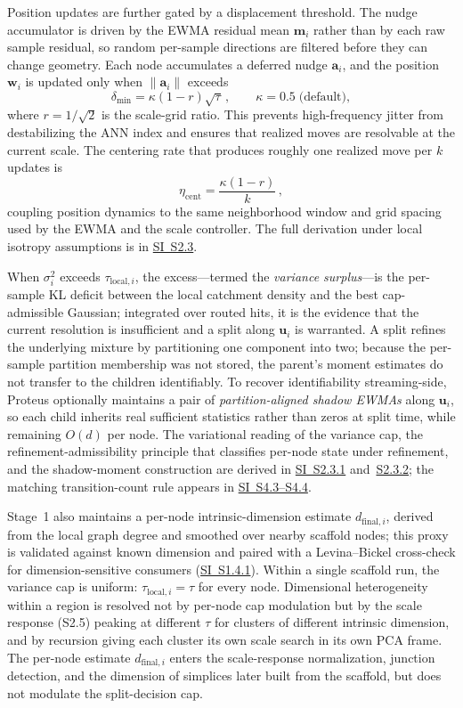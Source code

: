 \documentclass[11pt]{article}
\theoremstyle{definition}
\theoremstyle{plain}
\begin{document}
Position updates are further gated by a displacement threshold. The nudge accumulator is driven by the EWMA residual mean $\mathbf m_i$ rather than by each raw sample residual, so random per-sample directions are filtered before they can change geometry. Each node accumulates a deferred nudge $\mathbf a_i$, and the position $\mathbf w_i$ is updated only when $\|\mathbf a_i\|$ exceeds
\[
\delta_{\min}=\kappa(1-r)\sqrt{\tau}\,,
\qquad \kappa=0.5\;\text{(default)},
\]
where $r=1/\sqrt{2}$ is the scale-grid ratio. This prevents high-frequency jitter from destabilizing the ANN index and ensures that realized moves are resolvable at the current scale. The centering rate that produces roughly one realized move per $k$ updates is
\[
\eta_{\mathrm{cent}}=\frac{\kappa(1-r)}{k}\,,
\]
coupling position dynamics to the same neighborhood window and grid spacing used by the EWMA and the scale controller. The full derivation under local isotropy assumptions is in \hyperref[sec:si-dual-rate-motion]{SI~S2.3}.

When $\sigma_i^2$ exceeds $\tau_{\mathrm{local},i}$, the excess---termed the \emph{variance surplus}---is the per-sample KL deficit between the local catchment density and the best cap-admissible Gaussian; integrated over routed hits, it is the evidence that the current resolution is insufficient and a split along $\mathbf u_i$ is warranted. A split refines the underlying mixture by partitioning one component into two; because the per-sample partition membership was not stored, the parent's moment estimates do not transfer to the children identifiably. To recover identifiability streaming-side, Proteus optionally maintains a pair of \emph{partition-aligned shadow EWMAs} along $\mathbf u_i$, so each child inherits real sufficient statistics rather than zeros at split time, while remaining $O(d)$ per node. The variational reading of the variance cap, the refinement-admissibility principle that classifies per-node state under refinement, and the shadow-moment construction are derived in \hyperref[sec:si-variational-interpretation]{SI~S2.3.1} and~\hyperref[sec:si-shadow-moments]{S2.3.2}; the matching transition-count rule appears in \hyperref[sec:si-transition-policies]{SI~S4.3--S4.4}.

Stage~1 also maintains a per-node intrinsic-dimension estimate $d_{\mathrm{final},i}$, derived from the local graph degree and smoothed over nearby scaffold nodes; this proxy is validated against known dimension and paired with a Levina--Bickel cross-check for dimension-sensitive consumers (\hyperref[sec:si-intrinsic-dim]{SI~S1.4.1}). Within a single scaffold run, the variance cap is uniform: $\tau_{\mathrm{local},i}=\tau$ for every node. Dimensional heterogeneity within a region is resolved not by per-node cap modulation but by the scale response (S2.5) peaking at different $\tau$ for clusters of different intrinsic dimension, and by recursion giving each cluster its own scale search in its own PCA frame. The per-node estimate $d_{\mathrm{final},i}$ enters the scale-response normalization, junction detection, and the dimension of simplices later built from the scaffold, but does not modulate the split-decision cap.
\end{document}
